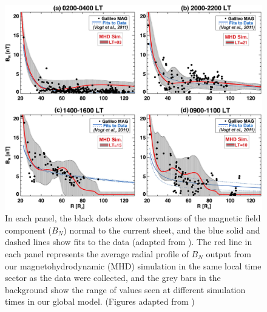 \begin{figure}
    \centering
    \includegraphics[width=\textwidth]{images2/comparison-magneticfield.jpg}
    \caption{In each panel, the black dots show observations of the magnetic field component ($B_N$) normal to the current sheet, and the blue solid and dashed lines show fits to the data (adapted from \protect{}). The red line in each panel represents the average radial profile of $B_N$ output from our magnetohydrodynamic (MHD) simulation in the same local time sector as the data were collected, and the grey bars in the background show the range of values seen at different simulation times in our global model. (Figures adapted from \protect{})}
    \label{fig:comparison-magneticfield}
\end{figure}

